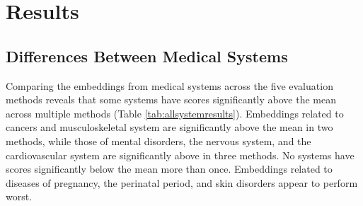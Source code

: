 \documentclass[11pt,a4paper]{article}
\begin{document}
\section{Results}

\subsection{Differences Between Medical Systems}

Comparing the embeddings from medical systems across the five evaluation methods reveals that some systems have scores significantly above the mean across multiple methods (Table \ref{tab:allsystemresults}). Embeddings related to cancers and musculoskeletal system are significantly above the mean in two methods, while those of mental disorders, the nervous system, and the cardiovascular system are significantly above in three methods. No systems have scores significantly below the mean more than once. Embeddings related to diseases of pregnancy, the perinatal period, and skin disorders appear to perform worst.  
\end{document}
